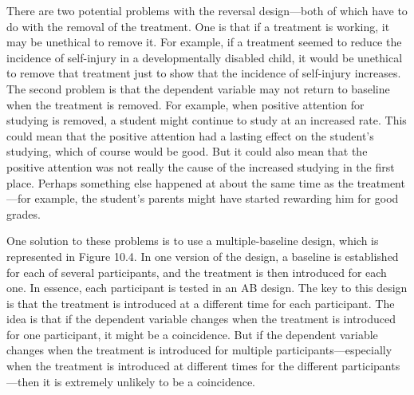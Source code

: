 There are two potential problems with the reversal design---both of which have to do with the removal of the treatment. One is that if a treatment is working, it may be unethical to remove it. For example, if a treatment seemed to reduce the incidence of self-injury in a developmentally disabled child, it would be unethical to remove that treatment just to show that the incidence of self-injury increases. The second problem is that the dependent variable may not return to baseline when the treatment is removed. For example, when positive attention for studying is removed, a student might continue to study at an increased rate. This could mean that the positive attention had a lasting effect on the student's studying, which of course would be good. But it could also mean that the positive attention was not really the cause of the increased studying in the first place. Perhaps something else happened at about the same time as the treatment---for example, the student's parents might have started rewarding him for good grades.

One solution to these problems is to use a multiple-baseline design, which is represented in Figure 10.4. In one version of the design, a baseline is established for each of several participants, and the treatment is then introduced for each one. In essence, each participant is tested in an AB design. The key to this design is that the treatment is introduced at a different time for each participant. The idea is that if the dependent variable changes when the treatment is introduced for one participant, it might be a coincidence. But if the dependent variable changes when the treatment is introduced for multiple participants---especially when the treatment is introduced at different times for the different participants---then it is extremely unlikely to be a coincidence.

